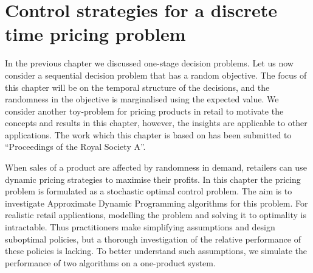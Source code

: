 \documentclass[main.tex]{subfiles}
\begin{document}
\chapter{Control strategies for a discrete time pricing
  problem}\label{ch:discrete_control}

In the previous chapter we discussed one-stage decision problems.
Let us now consider a sequential decision problem that has a random
objective. The focus of this chapter will be on the temporal structure of the
decisions, and the randomness in the objective is marginalised using
the expected value.
We consider another toy-problem for pricing
products in retail to motivate the concepts and results in this
chapter, however, the insights are applicable to other applications.
The work which this chapter is based on has been submitted to
``Proceedings of the Royal Society A''.

When sales of a product are affected by randomness in demand,
retailers can use dynamic pricing strategies to maximise their
profits. In this chapter the pricing problem is formulated as a
stochastic optimal control problem. The aim is to
investigate Approximate Dynamic Programming algorithms
\citep{powell2011approximate} for this
problem. For realistic retail applications, modelling the problem
and solving it to optimality is intractable. Thus practitioners make
simplifying assumptions and design suboptimal policies, but a thorough
investigation of the relative performance of these policies is
lacking. To better understand such assumptions, we simulate the
performance of two algorithms on a one-product system.

\end{document}
